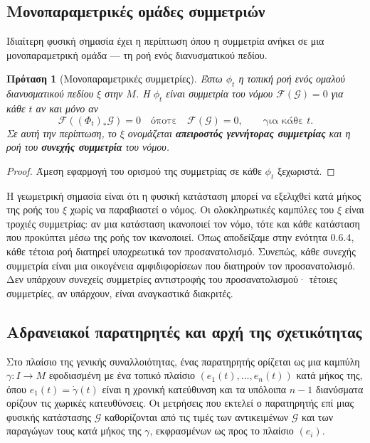 \documentclass[11pt,a4paper,twoside,openright]{book}
\newtheorem{proposition}[lemma]{Πρόταση}
\begin{document}
\subsection{Μονοπαραμετρικές ομάδες συμμετριών}

Ιδιαίτερη φυσική σημασία έχει η περίπτωση όπου η συμμετρία ανήκει σε μια μονοπαραμετρική ομάδα — τη ροή ενός διανυσματικού πεδίου.

\begin{proposition}[Μονοπαραμετρικές συμμετρίες]
\label{prop:one_parameter_symmetries}
Έστω $\phi_t$ η τοπική ροή ενός ομαλού διανυσματικού πεδίου $\xi$ στην $M$. Η $\phi_t$ είναι συμμετρία του νόμου $\mathcal{F}(\mathcal{G}) = 0$ για κάθε $t$ αν και μόνο αν
\[
\mathcal{F}((\Phi_t)_* \mathcal{G}) = 0 \quad \text{όποτε} \quad \mathcal{F}(\mathcal{G}) = 0, \qquad \text{για κάθε } t.
\]
Σε αυτή την περίπτωση, το $\xi$ ονομάζεται \textbf{απειροστός γεννήτορας συμμετρίας} και η ροή του \textbf{συνεχής συμμετρία} του νόμου.
\end{proposition}

\begin{proof}
Άμεση εφαρμογή του ορισμού της συμμετρίας σε κάθε $\phi_t$ ξεχωριστά.
\end{proof}

Η γεωμετρική σημασία είναι ότι η φυσική κατάσταση μπορεί να εξελιχθεί κατά μήκος της ροής του $\xi$ χωρίς να παραβιαστεί ο νόμος. Οι ολοκληρωτικές καμπύλες του $\xi$ είναι τροχιές συμμετρίας: αν μια κατάσταση ικανοποιεί τον νόμο, τότε και κάθε κατάσταση που προκύπτει μέσω της ροής τον ικανοποιεί. Όπως αποδείξαμε στην ενότητα 0.6.4, κάθε τέτοια ροή διατηρεί υποχρεωτικά τον προσανατολισμό. Συνεπώς, κάθε συνεχής συμμετρία είναι μια οικογένεια αμφιδιφορίσεων που διατηρούν τον προσανατολισμό. Δεν υπάρχουν συνεχείς συμμετρίες αντιστροφής του προσανατολισμού· τέτοιες συμμετρίες, αν υπάρχουν, είναι αναγκαστικά διακριτές.

\subsection{Αδρανειακοί παρατηρητές και αρχή της σχετικότητας}

Στο πλαίσιο της γενικής συναλλοιότητας, ένας παρατηρητής ορίζεται ως μια καμπύλη $\gamma: I \to M$ εφοδιασμένη με ένα τοπικό πλαίσιο $(e_1(t), \dots, e_n(t))$ κατά μήκος της, όπου $e_1(t) = \dot{\gamma}(t)$ είναι η χρονική κατεύθυνση και τα υπόλοιπα $n-1$ διανύσματα ορίζουν τις χωρικές κατευθύνσεις. Οι μετρήσεις που εκτελεί ο παρατηρητής επί μιας φυσικής κατάστασης $\mathcal{G}$ καθορίζονται από τις τιμές των αντικειμένων $\mathcal{G}$ και των παραγώγων τους κατά μήκος της $\gamma$, εκφρασμένων ως προς το πλαίσιο $(e_i)$.
\end{document}
